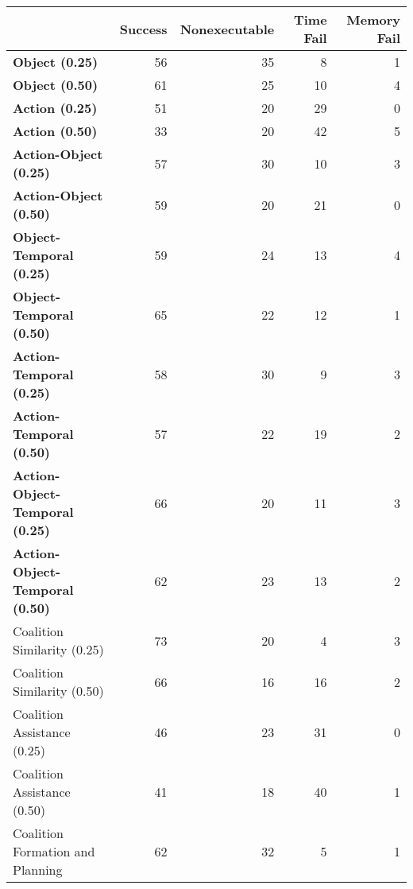 \begin{tabular}{lrrrr}
\hline
                                        &   Success &   Nonexecutable &   Time Fail &   Memory Fail \\
\hline
 \textbf{Object (0.25)}                 &        56 &              35 &           8 &             1 \\
 \textbf{Object (0.50)}                 &        61 &              25 &          10 &             4 \\
 \textbf{Action (0.25)}                 &        51 &              20 &          29 &             0 \\
 \textbf{Action (0.50)}                 &        33 &              20 &          42 &             5 \\
 \textbf{Action-Object (0.25)}          &        57 &              30 &          10 &             3 \\
 \textbf{Action-Object (0.50)}          &        59 &              20 &          21 &             0 \\
 \textbf{Object-Temporal (0.25)}        &        59 &              24 &          13 &             4 \\
 \textbf{Object-Temporal (0.50)}        &        65 &              22 &          12 &             1 \\
 \textbf{Action-Temporal (0.25)}        &        58 &              30 &           9 &             3 \\
 \textbf{Action-Temporal (0.50)}        &        57 &              22 &          19 &             2 \\
 \textbf{Action-Object-Temporal (0.25)} &        66 &              20 &          11 &             3 \\
 \textbf{Action-Object-Temporal (0.50)} &        62 &              23 &          13 &             2 \\
 Coalition Similarity (0.25)            &        73 &              20 &           4 &             3 \\
 Coalition Similarity (0.50)            &        66 &              16 &          16 &             2 \\
 Coalition Assistance (0.25)            &        46 &              23 &          31 &             0 \\
 Coalition Assistance (0.50)            &        41 &              18 &          40 &             1 \\
 Coalition Formation and Planning       &        62 &              32 &           5 &             1 \\
\hline
\end{tabular}
